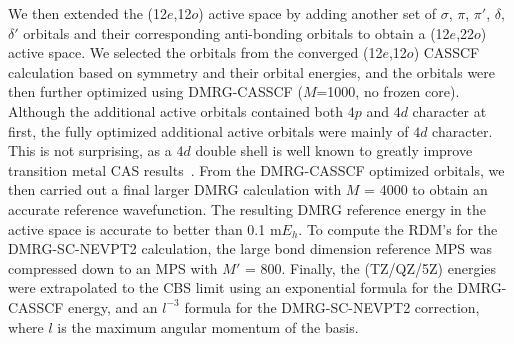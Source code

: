 We then extended the (12$e$,12$o$) active space by adding another set of $\sigma$, $\pi$, $\pi'$, $\delta$, $\delta'$ orbitals and their corresponding anti-bonding orbitals 
to obtain a (12$e$,22$o$) active space. We selected the orbitals from the converged (12$e$,12$o$) CASSCF calculation based on symmetry and their orbital energies,
and the orbitals were then further optimized using DMRG-CASSCF ($M$=1000, no frozen core). Although the additional active orbitals contained both $4p$ and $4d$ character at first, 
the fully optimized additional active orbitals were mainly of $4d$ character.  This is not surprising, as a $4d$ double shell is well known to greatly improve transition metal CAS results~\cite{andersson_excitation_1992}.
From the DMRG-CASSCF optimized orbitals, we then carried out a final larger DMRG calculation with $M$ = 4000 to obtain an accurate reference wavefunction.
The resulting DMRG reference energy in the active space is accurate to better than 0.1 m$E_h$.
To compute the RDM's for the DMRG-SC-NEVPT2 calculation, the large bond dimension reference MPS was compressed down to an MPS with $M'$ = 800. 
Finally, the (TZ/QZ/5Z) energies were extrapolated to the CBS limit using
an exponential formula for the DMRG-CASSCF energy, and an $l^{-3}$ formula for the DMRG-SC-NEVPT2 correction, where $l$ is the maximum angular momentum
of the basis.

